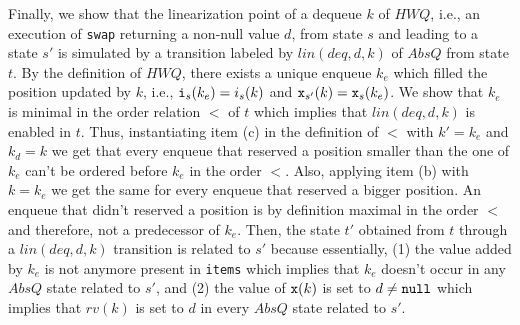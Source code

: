 Finally, we show that the linearization point of a dequeue $k$ of $\mathit{HWQ}$, i.e., an execution of {\tt swap} returning a non-null value $d$, from state $s$ and leading to a state $s'$ is simulated by a transition labeled by $lin(deq,d,k)$ of $AbsQ$ from state $t$. By the definition of $\mathit{HWQ}$, there exists a unique enqueue $k_e$ which filled the position updated by $k$, i.e., ${\tt i}_s(k_e)=i_s(k)$ and ${\tt x}_{s'}(k)={\tt x}_s(k_e)$. We show that $k_e$ is minimal in the order relation $<$ of $t$ which implies that $lin(deq,d,k)$ is enabled in $t$. Thus, instantiating item (c) in the definition of $<$ with $k'=k_e$ and $k_d=k$ we get that every enqueue that reserved a position smaller than the one of $k_e$ can't be ordered before $k_e$ in the order $<$. Also, applying item (b) with $k=k_e$ we get the same for every enqueue that reserved a bigger position. An enqueue that didn't reserved a position is by definition maximal in the order $<$ and therefore, not a predecessor of $k_e$. Then, the state $t'$ obtained from $t$ through a $lin(deq,d,k)$ transition is related to $s'$ because essentially, (1) the value added by $k_e$ is not anymore present in {\tt items} which implies that $k_e$ doesn't occur in any $AbsQ$ state related to $s'$, and (2) the value of ${\tt x}(k)$ is set to $d\neq {\tt null}$ which implies that $rv(k)$ is set to $d$ in every $AbsQ$ state related to $s'$.
%
%